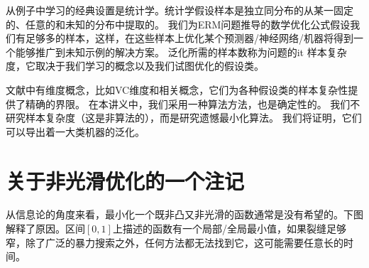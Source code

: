 从例子中学习的经典设置是统计学。统计学假设样本是独立同分布的从某一固定的、任意的和未知的分布中提取的。
我们为ERM问题推导的数学优化公式假设我们有足够多的样本，这样，在这些样本上优化某个预测器/神经网络/机器将得到一个能够推广到未知示例的解决方案。
泛化所需的样本数称为问题的{it 样本复杂度}，它取决于我们学习的概念以及我们试图优化的假设类。

文献中有维度概念，比如VC维度和相关概念，它们为各种假设类的样本复杂性提供了精确的界限。
在本讲义中，我们采用一种算法方法，也是确定性的。
我们不研究样本复杂度（这是非算法的），而是研究遗憾最小化算法。
我们将证明，它们可以导出着一大类机器的泛化。

\section{
	关于非光滑优化的一个注记
	}

从信息论的角度来看，最小化一个既非凸又非光滑的函数通常是没有希望的。下图解释了原因。区间$[0,1]$上描述的函数有一个局部/全局最小值，如果裂缝足够窄，除了广泛的暴力搜索之外，任何方法都无法找到它，这可能需要任意长的时间。

